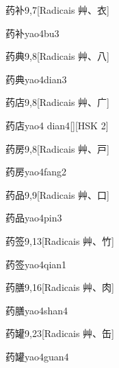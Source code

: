 \begin{entry}{药补}{9,7}[Radicais ⾋、⾐]
  \begin{phonetics}{药补}{yao4bu3}
  \end{phonetics}
\end{entry}

\begin{entry}{药典}{9,8}[Radicais ⾋、⼋]
  \begin{phonetics}{药典}{yao4dian3}
  \end{phonetics}
\end{entry}

\begin{entry}{药店}{9,8}[Radicais ⾋、⼴]
  \begin{phonetics}{药店}{yao4 dian4}[][HSK 2]
  \end{phonetics}
\end{entry}

\begin{entry}{药房}{9,8}[Radicais ⾋、⼾]
  \begin{phonetics}{药房}{yao4fang2}
  \end{phonetics}
\end{entry}

\begin{entry}{药品}{9,9}[Radicais ⾋、⼝]
  \begin{phonetics}{药品}{yao4pin3}
  \end{phonetics}
\end{entry}

\begin{entry}{药签}{9,13}[Radicais ⾋、⽵]
  \begin{phonetics}{药签}{yao4qian1}
  \end{phonetics}
\end{entry}

\begin{entry}{药膳}{9,16}[Radicais ⾋、⾁]
  \begin{phonetics}{药膳}{yao4shan4}
  \end{phonetics}
\end{entry}

\begin{entry}{药罐}{9,23}[Radicais ⾋、⽸]
  \begin{phonetics}{药罐}{yao4guan4}
  \end{phonetics}
\end{entry}

